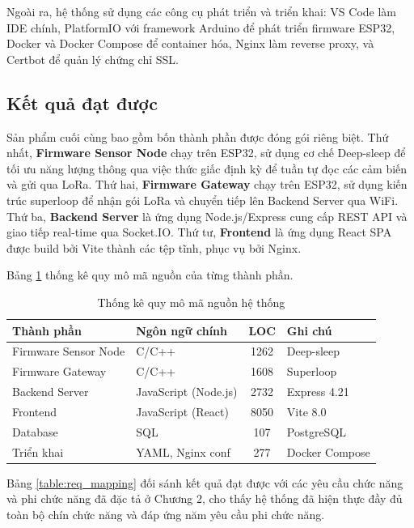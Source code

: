 \documentclass[../DoAn.tex]{subfiles}
\begin{document}
Ngoài ra, hệ thống sử dụng các công cụ phát triển và triển khai: VS Code làm IDE chính, PlatformIO với framework Arduino để phát triển firmware ESP32, Docker và Docker Compose để container hóa, Nginx làm reverse proxy, và Certbot để quản lý chứng chỉ SSL.

\subsection{Kết quả đạt được}
\label{subsection:4.3.2}

Sản phẩm cuối cùng bao gồm bốn thành phần được đóng gói riêng biệt. Thứ nhất, \textbf{Firmware Sensor Node} chạy trên ESP32, sử dụng cơ chế Deep-sleep để tối ưu năng lượng thông qua việc thức giấc định kỳ để tuần tự đọc các cảm biến và gửi qua LoRa. Thứ hai, \textbf{Firmware Gateway} chạy trên ESP32, sử dụng kiến trúc superloop để nhận gói LoRa và chuyển tiếp lên Backend Server qua WiFi. Thứ ba, \textbf{Backend Server} là ứng dụng Node.js/Express cung cấp \gls{REST} \gls{API} và giao tiếp real-time qua Socket.IO. Thứ tư, \textbf{Frontend} là ứng dụng React \gls{SPA} được build bởi Vite thành các tệp tĩnh, phục vụ bởi Nginx.

Bảng \ref{table:stats} thống kê quy mô mã nguồn của từng thành phần.

\begin{table}[H]
\centering
\caption{Thống kê quy mô mã nguồn hệ thống}
\label{table:stats}
\small
\begin{tabularx}{\textwidth}{|X|X|c|X|}
\hline
\textbf{Thành phần} & \textbf{Ngôn ngữ chính} & \textbf{LOC} & \textbf{Ghi chú} \\
\hline
Firmware Sensor Node & C/C++ & 1262 & Deep-sleep \\
\hline
Firmware Gateway & C/C++ & 1608 & Superloop \\
\hline
Backend Server & JavaScript (Node.js) & 2732 & Express 4.21 \\
\hline
Frontend & JavaScript (React) & 8050 & Vite 8.0 \\
\hline
Database & SQL & 107 & PostgreSQL \\
\hline
Triển khai & YAML, Nginx conf & 277 & Docker Compose \\
\hline  
\end{tabularx}
\end{table}

Bảng \ref{table:req_mapping} đối sánh kết quả đạt được với các yêu cầu chức năng và phi chức năng đã đặc tả ở Chương 2, cho thấy hệ thống đã hiện thực đầy đủ toàn bộ chín chức năng và đáp ứng năm yêu cầu phi chức năng.
\end{document}
